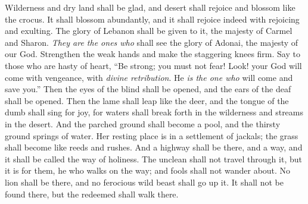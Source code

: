 \begin{biblechapter} %
 Wilderness and dry land shall be glad, 
and desert shall rejoice and blossom like the crocus.
\verse It shall blossom abundantly, 
and it shall rejoice indeed with rejoicing and exulting. 
The glory of Lebanon shall be given to it, 
the majesty of Carmel and Sharon. 
\textit{They are the ones who} shall see the glory of Adonai, 
the majesty of our God.
\verse Strengthen the weak hands 
and make the staggering knees firm.
\verse Say to those who are hasty of heart,
\verse “Be strong; you must not fear! 
Look! your God will come with vengeance, 
with \textit{divine retribution}. 
He \textit{is the one who} will come and save you.”
\verse Then the eyes of the blind shall be opened, 
and the ears of the deaf shall be opened.
\verse Then the lame shall leap like the deer, 
and the tongue of the dumb shall sing for joy, 
for waters shall break forth in the wilderness 
and streams in the desert.
\verse And the parched ground shall become a pool, 
and the thirsty ground springs of water. 
Her resting place is in a settlement of jackals; 
the grass shall become like reeds and rushes.
\verse And a highway shall be there, and a way, 
and it shall be called the way of holiness. 
The unclean shall not travel through it, 
but it is for them, he who walks on the way; 
and fools shall not wander about.
\verse No lion shall be there, 
and no ferocious wild beast shall go up it. 
It shall not be found there, 
but the redeemed shall walk there.
\end{biblechapter}

